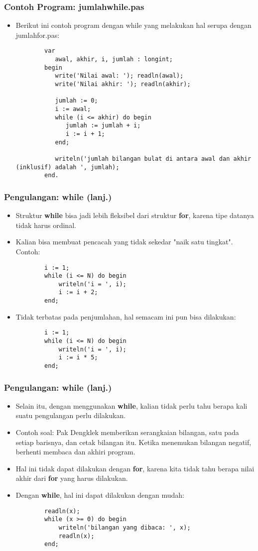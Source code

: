 \documentclass{beamer}
\begin{document}
\begin{frame}[fragile]
\frametitle{Contoh Program: jumlahwhile.pas}
\begin{itemize}
	\item Berikut ini contoh program dengan while yang melakukan hal serupa dengan jumlahfor.pas:
	\begin{lstlisting}
		var
		   awal, akhir, i, jumlah : longint;
		begin
		   write('Nilai awal: '); readln(awal);
		   write('Nilai akhir: '); readln(akhir);
		
		   jumlah := 0;
		   i := awal;
		   while (i <= akhir) do begin
		      jumlah := jumlah + i;
		      i := i + 1;
		   end;
		
		   writeln('jumlah bilangan bulat di antara awal dan akhir (inklusif) adalah ', jumlah);
		end.
	\end{lstlisting}
\end{itemize}
\end{frame}

\begin{frame}[fragile]
\frametitle{Pengulangan: while (lanj.)} 
\begin{itemize}
	\item Struktur \textbf{while} bisa jadi lebih fleksibel dari struktur \textbf{for}, karena tipe datanya tidak harus ordinal.
	\item Kalian bisa membuat pencacah yang tidak sekedar "naik satu tingkat". Contoh:
	\begin{lstlisting}
		i := 1;
		while (i <= N) do begin
		    writeln('i = ', i);
		    i := i + 2;
		end;
	\end{lstlisting}
	
	\item Tidak terbatas pada penjumlahan, hal semacam ini pun bisa dilakukan:
	\begin{lstlisting}
		i := 1;
		while (i <= N) do begin
		    writeln('i = ', i);
		    i := i * 5;
		end;
	\end{lstlisting}
\end{itemize}
\end{frame}

\begin{frame}[fragile]
\frametitle{Pengulangan: while (lanj.)} 
\begin{itemize}
	\item Selain itu, dengan menggunakan \textbf{while}, kalian tidak perlu tahu berapa kali suatu pengulangan perlu dilakukan.
	\item Contoh soal: Pak Dengklek memberikan serangkaian bilangan, satu pada setiap barisnya, dan cetak bilangan itu. Ketika menemukan bilangan negatif, berhenti membaca dan akhiri program.
	\item Hal ini tidak dapat dilakukan dengan \textbf{for}, karena kita tidak tahu berapa nilai akhir dari \textbf{for} yang harus dilakukan.
	\item Dengan \textbf{while}, hal ini dapat dilakukan dengan mudah:
	\begin{lstlisting}
		readln(x);
		while (x >= 0) do begin
		    writeln('bilangan yang dibaca: ', x);
		    readln(x);
		end;
	\end{lstlisting}
\end{itemize}
\end{frame}
\end{document}
